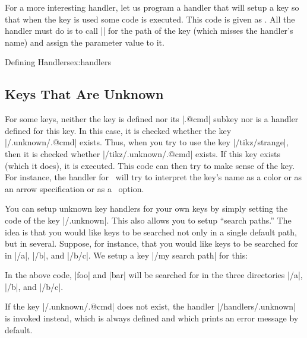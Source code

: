 For a more interesting handler, let us program a handler that will
setup a key so that when the key is used some code is executed. This
code is given as . All the handler must do is to call
|\pgfkeysdef| for the path of the key (which misses the handler's
name) and assign the parameter value to it.

\begin{texexample}{Defining Handlers}{ex:handlers}
 {}
\end{texexample}


\subsection{Keys That Are Unknown}

For some keys, neither the key is defined nor its |.@cmd| subkey nor
is a handler defined for this key. In this case, it is checked whether
the key |/.unknown/.@cmd| exists. Thus, when you try to
use the key |/tikz/strange|, then it is checked whether
|/tikz/.unknown/.@cmd| exists. If this key exists (which it does), it is
executed. This code can then try to make sense of the key. For
instance, the handler for \tikzname\ will try to interpret the key's
name as a color or as an arrow specification or as a \pgfname\
option.

You can setup unknown key handlers for your own keys by simply setting
the code of the key \meta{my path prefix}|/.unknown|. This also allows
you to setup ``search paths.'' The idea is that you would like keys to
be searched not only in a single default path, but in
several. Suppose, for instance, that you would like keys to be
searched 
for in |/a|, |/b|, and |/b/c|. We setup a key |/my search path| for
this:

\begin{teXXX}
\end{teXXX}



In the above code, |foo| and |bar| will be searched for in the three
directories  |/a|, |/b|, and |/b/c|. 

If the key |/.unknown/.@cmd| does not exist, the
handler |/handlers/.unknown| is invoked instead, which is always
defined and which prints an error message by default.

